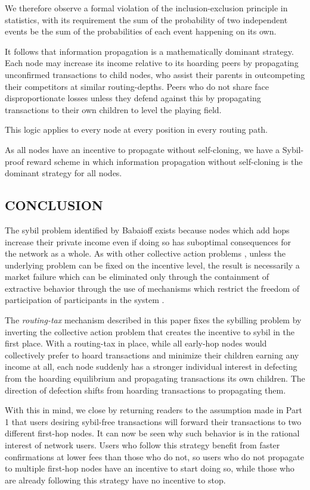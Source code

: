 \documentclass[oneside]{article}   	%
\begin{document}
\begin{multicols}{2}
We therefore observe a formal violation of the inclusion-exclusion principle in statistics, with its requirement the sum of the probability of two independent events be the sum of the probabilities of each event happening on its own.

It follows that information propagation is a mathematically dominant strategy. Each node may increase its income relative to its hoarding peers by propagating unconfirmed transactions to child nodes, who assist their parents in outcompeting their competitors at similar routing-depths. Peers who do not share face disproportionate losses unless they defend against this by propagating transactions to their own children to level the playing field.

This logic applies to every node at every position in every routing path.

As all nodes have an incentive to propagate without self-cloning, we have a Sybil-proof reward scheme in which information propagation without self-cloning is the dominant strategy for all nodes.


\subsection*{CONCLUSION}

The sybil problem identified by Babaioff exists because nodes which add hops increase their private income even if doing so has suboptimal consequences for the network as a whole. As with other collective action problems \cite{olson1971logic}, unless the underlying problem can be fixed on the incentive level, the result is necessarily a market failure \cite{DBLP:journals/corr/abs-2110-10606} which can be eliminated only through the containment of extractive behavior through the use of mechanisms which restrict the freedom of participation of participants in the system \cite{DBLP:journals/corr/AbrahamMNRS16} \cite{DBLP:journals/corr/abs-1712-07564}.

The \textit{routing-tax} mechanism described in this paper fixes the sybilling problem by inverting the collective action problem that creates the incentive to sybil in the first place. With a routing-tax in place, while all early-hop nodes would collectively prefer to hoard transactions and minimize their children earning any income at all, each node suddenly has a stronger individual interest in defecting from the hoarding equilibrium and propagating transactions its own children. The direction of defection shifts from hoarding transactions to propagating them.

With this in mind, we close by returning readers to the assumption made in Part 1 that users desiring sybil-free transactions will forward their transactions to two different first-hop nodes. It can now be seen why such behavior is in the rational interest of network users. Users who follow this strategy benefit from faster confirmations at lower fees than those who do not, so users who do not propagate to multiple first-hop nodes have an incentive to start doing so, while those who are already following this strategy have no incentive to stop.

\end{multicols} 
\end{document}
